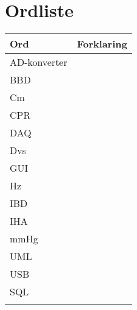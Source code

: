 \chapter{Ordliste}

\begin{longtabu} to 
    Ord &    Forklaring\\
    \toprule 
    AD-konverter & \\
    BBD & \\	
	Cm & \\    
    CPR & \\
    DAQ & \\
	Dvs & \\
	GUI & \\
	Hz & \\
	IBD & \\
	IHA & \\
	mmHg & \\
	UML & \\
	USB & \\
	SQL & \\
	
\label{forkort}
\end{longtabu}